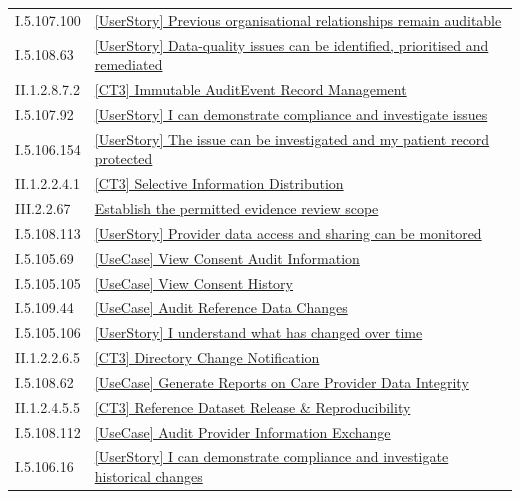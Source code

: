 \begin{longtable}{p{.22\linewidth}p{.73\linewidth}}
I.5.107.100 & \hyperref[element:557c655fb77146dbb33177170ce2af7a]{[UserStory] Previous organisational relationships remain auditable} \\
I.5.108.63 & \hyperref[element:6afb5df83ce140679f385ddff2960a51]{[UserStory] Data-quality issues can be identified, prioritised and remediated} \\
II.1.2.8.7.2 & \hyperref[element:70e9f760ebd34045b8dd92f31fb8a00b]{[CT3] Immutable AuditEvent Record Management} \\
I.5.107.92 & \hyperref[element:7151b426d0304920b73bd7033dc7b63e]{[UserStory] I can demonstrate compliance and investigate issues} \\
I.5.106.154 & \hyperref[element:753c615ef14848919909618cd650719b]{[UserStory] The issue can be investigated and my patient record protected} \\
II.1.2.2.4.1 & \hyperref[element:87869a1eec5f4c7cb87600a06cc8fd6e]{[CT3] Selective Information Distribution} \\
III.2.2.67 & \hyperref[element:88a66a2803c04a93a157a19d05297bee]{Establish the permitted evidence review scope} \\
I.5.108.113 & \hyperref[element:8960c608de434d9bb14fbe639247ad26]{[UserStory] Provider data access and sharing can be monitored} \\
I.5.105.69 & \hyperref[element:8ba1069d695740e1b193af1d7f8c8960]{[UseCase] View Consent Audit Information} \\
I.5.105.105 & \hyperref[element:946db0fc796b41c09b9e8c1c640550a8]{[UseCase] View Consent History} \\
I.5.109.44 & \hyperref[element:a11027ce27df480f8b3c3b02464fab2d]{[UseCase] Audit Reference Data Changes} \\
I.5.105.106 & \hyperref[element:a216c860a9244a07b4a691379c41d86b]{[UserStory] I understand what has changed over time} \\
II.1.2.2.6.5 & \hyperref[element:a633f3a1cba049a0b427c5f1854e5e82]{[CT3] Directory Change Notification} \\
I.5.108.62 & \hyperref[element:ae05cccff38f4d3cbbe1f55a008c6141]{[UseCase] Generate Reports on Care Provider Data Integrity} \\
II.1.2.4.5.5 & \hyperref[element:b01212ce058843b2bfee85a6d3062525]{[CT3] Reference Dataset Release \& Reproducibility} \\
I.5.108.112 & \hyperref[element:b9e02f26483046c5b64353823ef27c59]{[UseCase] Audit Provider Information Exchange} \\
I.5.106.16 & \hyperref[element:bfc6e1bbdb814aa6be80e868b1870447]{[UserStory] I can demonstrate compliance and investigate historical changes} \\

\end{longtable}
